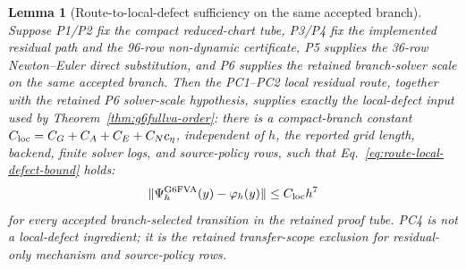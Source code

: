 \documentclass[preprint,12pt]{elsarticle}
\newtheorem{lemma}{Lemma}
\begin{document}
\begin{lemma}[Route-to-local-defect sufficiency on the same accepted branch]
\label{lem:route-local-defect-sufficiency}
Suppose P1/P2 fix the compact reduced-chart tube, P3/P4 fix the implemented
residual path and the 96-row non-dynamic certificate, P5 supplies the 36-row
Newton--Euler direct substitution, and P6 supplies the retained branch-solver
scale on the same accepted branch. Then the PC1--PC2 local residual route,
together with the retained P6 solver-scale hypothesis, supplies exactly the
local-defect input used by
Theorem~\ref{thm:g6fullva-order}: there is a compact-branch constant
\(C_{\rm loc}=C_G+C_A+C_E+C_Nc_\eta\), independent of \(h\), the reported
grid length, backend, finite solver logs, and source-policy rows, such that
Eq.~\eqref{eq:route-local-defect-bound} holds:
\begin{equation}
\label{eq:route-local-defect-bound}
  \|\Psi_h^{\mathrm{G6FVA}}(y)-\varphi_h(y)\|
  \le C_{\rm loc}h^7
\end{equation}
for every accepted branch-selected transition in the retained proof tube.
PC4 is not a local-defect ingredient; it is the retained transfer-scope exclusion
for residual-only mechanism and source-policy rows.
\end{lemma}
\end{document}
